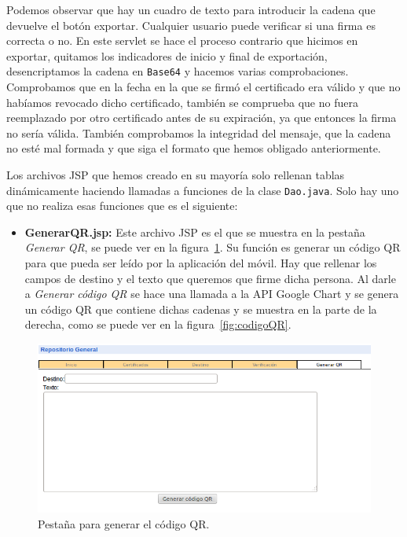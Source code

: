 \begin{itemize}

Podemos observar que hay un cuadro de texto para introducir la cadena que devuelve el botón exportar. Cualquier usuario puede verificar si una firma es correcta o no. En este servlet se hace el proceso contrario que hicimos en exportar, quitamos los indicadores de inicio y final de exportación, desencriptamos la cadena en \lstinline{Base64} y hacemos varias comprobaciones. Comprobamos que en la fecha en la que se firmó el certificado era válido y que no habíamos revocado dicho certificado, también se comprueba que no fuera reemplazado por otro certificado antes de su expiración, ya que entonces la firma no sería válida. También comprobamos la integridad del mensaje, que la cadena no esté mal formada y que siga el formato que hemos obligado anteriormente.

\end{itemize}

Los archivos JSP que hemos creado en su mayoría solo rellenan tablas dinámicamente haciendo llamadas a funciones de la clase \lstinline{Dao.java}. Solo hay uno que no realiza esas funciones que es el siguiente:

\begin{itemize}

\item \textbf{GenerarQR.jsp:} Este archivo JSP es el que se muestra en la pestaña \textit{Generar QR}, se puede ver en la figura~\ref{fig:pestanhaQR}. Su función es generar un código QR para que pueda ser leído por la aplicación del móvil. Hay que rellenar los campos de destino y el texto que queremos que firme dicha persona. Al darle a \textit{Generar código QR} se hace una llamada a la API Google Chart y se genera un código QR que contiene dichas cadenas y se muestra en la parte de la derecha, como se puede ver en la figura~\ref{fig:codigoQR}.

\end{itemize}

\begin{figure}[h]
  \centering
    \includegraphics[scale=0.5]{./GoogleAppEngine/imagenes/pestanhaQR.png}
  \caption{Pestaña para generar el código QR.}
  \label{fig:pestanhaQR}
\end{figure}

